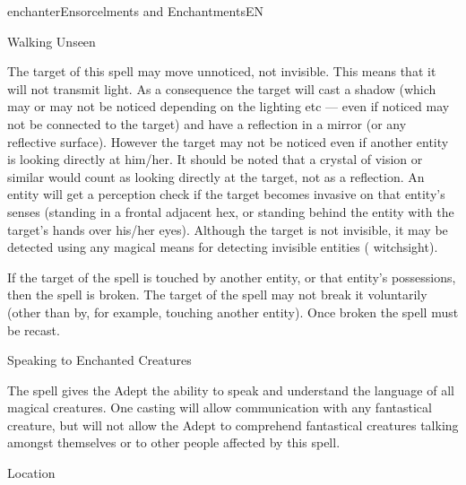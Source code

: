 \begin{college}[1.1]{enchanter}{Ensorcelments and Enchantments}{EN}
\begin{spell}[G-4]{Walking Unseen}

\begin{effects}
The target of this spell may move unnoticed, not invisible.  This
means that it will not transmit light.  As a consequence the target
will cast a shadow (which may or may not be noticed depending on the
lighting etc --- even if noticed may not be connected to the target)
and have a reflection in a mirror (or any reflective surface).
However the target may not be noticed even if another entity is
looking directly at him/her. It should be noted that a crystal of
vision or similar would count as looking directly at the target, not
as a reflection.  An entity will get a perception check if the target
becomes invasive on that entity's senses (\eg standing in a frontal
adjacent hex, or standing behind the entity with the target's hands
over his/her eyes).  Although the target is not invisible, it may be
detected using any magical means for detecting invisible entities (\eg
witchsight).

If the target of the spell is touched by another entity, or that
entity's possessions, then the spell is broken.  The target of the
spell may not break it voluntarily (other than by, for example,
touching another entity). Once broken the spell must be recast.
\end{effects}
\end{spell}

\begin{spell}[G-5]{Speaking to Enchanted Creatures}

\begin{effects}
The spell gives the Adept the ability to speak and understand the
language of all magical creatures.  One casting will allow
communication with any fantastical creature, but will not allow the
Adept to comprehend fantastical creatures talking amongst themselves
or to other people affected by this spell.
\end{effects}
\end{spell}

\begin{spell}[G-6]{Location}


\end{spell}
\end{college}
